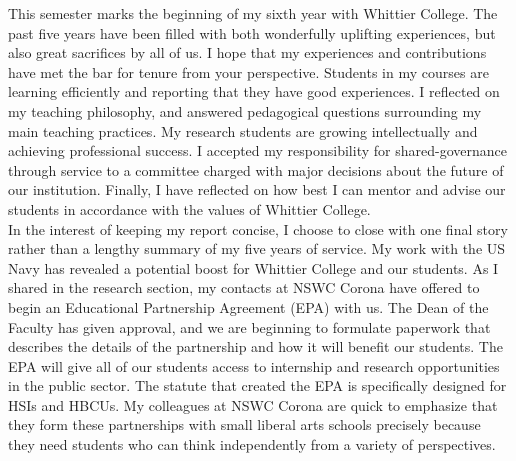 \documentclass[../main.tex]{subfiles}
\begin{document}
This semester marks the beginning of my sixth year with Whittier College.  The past five years have been filled with both wonderfully uplifting experiences, but also great sacrifices by all of us.  I hope that my experiences and contributions have met the bar for tenure from your perspective.  Students in my courses are learning efficiently and reporting that they have good experiences.  I reflected on my teaching philosophy, and answered pedagogical questions surrounding my main teaching practices.  My research students are growing intellectually and achieving professional success.  I accepted my responsibility for shared-governance through service to a committee charged with major decisions about the future of our institution.  Finally, I have reflected on how best I can mentor and advise our students in accordance with the values of Whittier College. 
\\
\vspace{0.15cm}
In the interest of keeping my report concise, I choose to close with one final story rather than a lengthy summary of my five years of service.  My work with the US Navy has revealed a potential boost for Whittier College and our students.  As I shared in the research section, my contacts at NSWC Corona have offered to begin an Educational Partnership Agreement (EPA) with us.  The Dean of the Faculty has given approval, and we are beginning to formulate paperwork that describes the details of the partnership and how it will benefit our students.  The EPA will give all of our students access to internship and research opportunities in the public sector.  The statute that created the EPA is specifically designed for HSIs and HBCUs.  My colleagues at NSWC Corona are quick to emphasize that they form these partnerships with small liberal arts schools precisely because they need students who can think independently from a variety of perspectives.
\\
\vspace{0.15cm}
\end{document}
